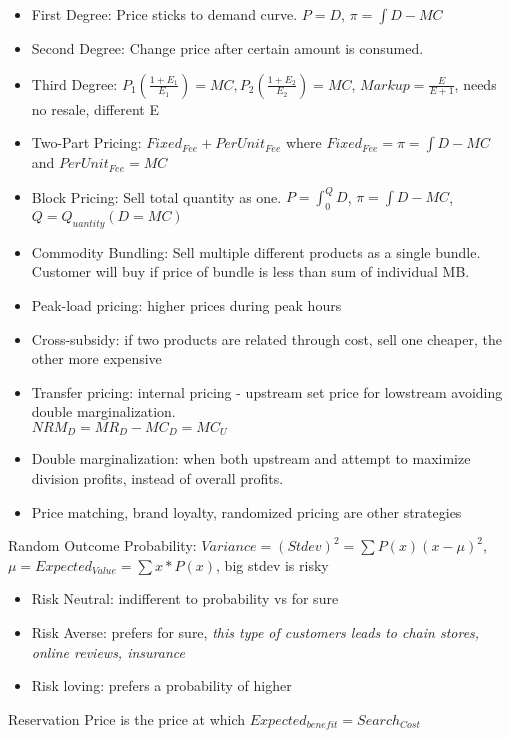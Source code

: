 \documentclass[nobib,fleqn,8pt]{article}
\begin{document}
\begin{itemize}
    \item First Degree: Price sticks to demand curve. $P=D$, $\pi = \int D-MC$
    \item Second Degree: Change price after certain amount is consumed.
    \item Third Degree: $P_1\left(\frac{1+E_1}{E_1}\right)=MC,
              P_2\left(\frac{1+E_2}{E_2}\right)=MC$, $Markup = \frac{E}{E+1}$, needs no
          resale, different E
    \item Two-Part Pricing: $Fixed_{Fee}+PerUnit_{Fee}$ where $Fixed_{Fee} =\pi = \int
              D-MC$ and $PerUnit_{Fee} = MC$
    \item Block Pricing: Sell total quantity as one. $P = \int_{0}^{Q}D$, $\pi = \int
              D-MC$, $Q= Q_{uantity}(D=MC)$
    \item Commodity Bundling: Sell multiple different products as a single bundle.
          Customer will buy if price of bundle is less than sum of individual MB.
    \item Peak-load pricing: higher prices during peak hours
    \item Cross-subsidy: if two products are related through cost, sell one cheaper, the other more expensive
    \item Transfer pricing: internal pricing - upstream set price for lowstream avoiding double marginalization. \\$NRM_D = MR_D-MC_D = MC_U$
    \item Double marginalization: when both upstream and attempt to maximize division profits, instead of overall profits.
    \item Price matching, brand loyalty, randomized pricing are other strategies
\end{itemize}
Random Outcome Probability: $Variance = (Stdev)^2 = \sum P(x)(x-\mu)^2 $, $\mu = Expected_{Value} = \sum x*P(x)$, big stdev is risky\\
\begin{itemize}
    \item Risk Neutral: indifferent to probability vs for sure
    \item Risk Averse: prefers for sure, \textit{this type of customers leads to chain
              stores, online reviews, insurance}
    \item Risk loving: prefers a probability of higher
\end{itemize}
Reservation Price is the price at which $Expected_{benefit} = Search_{Cost}$\\
\end{document}
